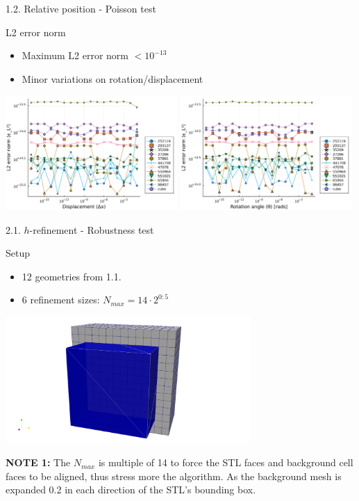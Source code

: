 \documentclass{beamer}
\begin{document}
\begin{frame}{1.2. Relative position - Poisson test}

  \begin{block}{L2 error norm}
  \begin{itemize}
    \item
      Maximum L2 error norm $< 10^{-13}$
    \item
      Minor variations on rotation/displacement
  \end{itemize}
  \end{block}

  \includegraphics[width=0.49\textwidth]{../analysis/plots/x_displacement_y_error_l2}
  \includegraphics[width=0.49\textwidth]{../analysis/plots/x_rotation_y_error_l2}
\end{frame}


\begin{frame}{2.1. $h$-refinement - Robustness test}
  \begin{block}{Setup}
    \begin{itemize}
      \item
        12 geometries from 1.1.
      \item
        6 refinement sizes: $N_{max} = 14 \cdot 2^{0:5}$
    \end{itemize}
  \end{block}

  \includegraphics[width=0.7\textwidth]{cube_bb}

  \textbf{NOTE 1:} The $N_{max}$ is multiple of 14 to force the STL faces and background cell faces to be aligned, thus stress more the algorithm. As the background mesh is expanded 0.2 in each direction of the STL's bounding box.
\end{frame}
\end{document}
